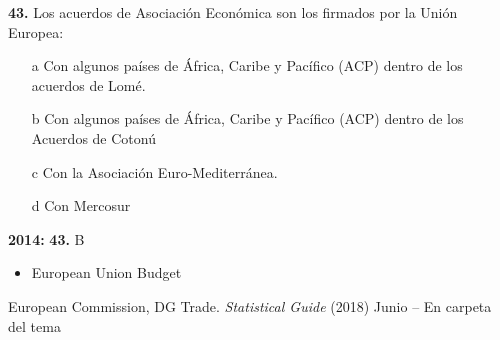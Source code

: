 \documentclass{nuevotema}
\begin{document}

\preguntas


\textbf{43.} Los acuerdos de Asociación Económica son los firmados por la Unión Europea:

\begin{itemize}
	\item[a] Con algunos países de África, Caribe y Pacífico (ACP) dentro de los acuerdos de Lomé.
	\item[b] Con algunos países de África, Caribe y Pacífico (ACP) dentro de los Acuerdos de Cotonú
	\item[c] Con la Asociación Euro-Mediterránea.
	\item[d] Con Mercosur
\end{itemize}

\notas

\textbf{2014:} \textbf{43.} B

\bibliografia

\begin{itemize}
	\item European Union Budget
\end{itemize}

European Commission, DG Trade. \textit{Statistical Guide} (2018) Junio -- En carpeta del tema
\end{document}
